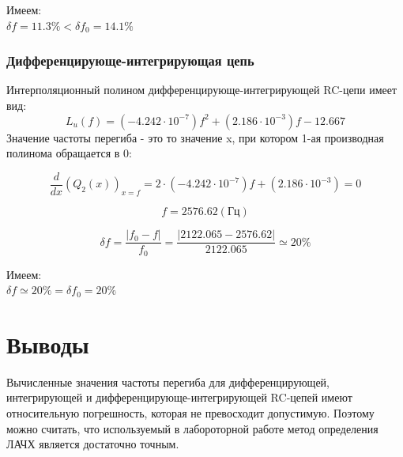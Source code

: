 Имеем:\\
$\delta f = 11.3 \% < \delta f_0 = 14.1\%$

\subsubsection{Дифференцирующе-интегрирующая цепь}
Интерполяционный полином дифференцирующе-интегрирующей RC-цепи имеет вид:
\begin{equation}
L_u(f) = (-4.242 \cdot 10^{-7})f^2 + (2.186 \cdot 10^{-3})f -12.667
\end{equation}
Значение частоты перегиба - это то значение x, при котором 1-ая производная полинома обращается в 0:

\begin{equation}
\frac{d}{dx} (Q_2(x))_{x=f} = 2 \cdot (-4.242 \cdot 10^{-7})f + (2.186 \cdot 10^{-3}) = 0
\end{equation}

\begin{equation}
f = 2576.62 (\text{Гц})
\end{equation}

\begin{equation}
\delta f = \frac{|f_0 - f|}{f_0} = \frac{|2122.065 - 2576.62|}{2122.065} \simeq 20 \% 
\end{equation}

Имеем:\\
$\delta f \simeq 20 \% = \delta f_0 = 20\%$
  
\section{Выводы}
Вычисленные значения частоты перегиба для дифференцирующей, интегрирующей и дифференцирующе-интегрирующей RC-цепей имеют относительную погрешность, которая не превосходит допустимую. Поэтому можно считать, что используемый в лабороторной работе метод определения ЛАЧХ является достаточно точным.


